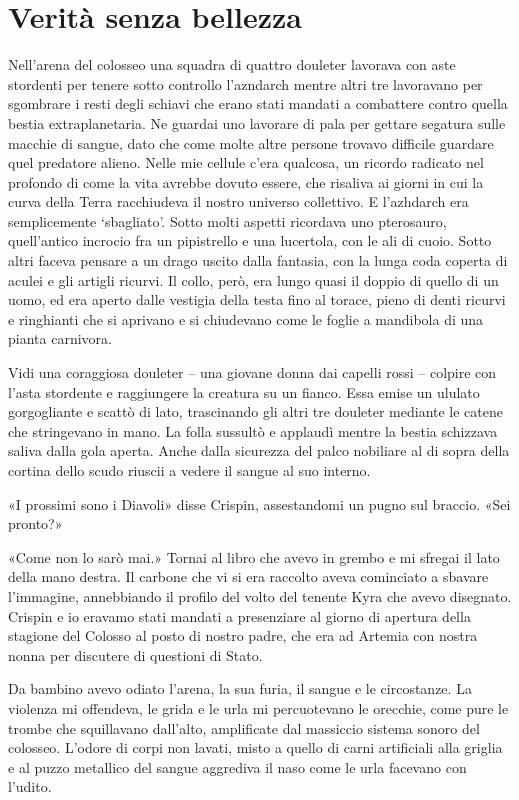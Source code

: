 \chapter{Verità senza bellezza}

Nell'arena del colosseo una squadra di quattro douleter lavorava con
aste stordenti per tenere sotto controllo l'azndarch mentre altri tre
lavoravano per sgombrare i resti degli schiavi che erano stati mandati a
combattere contro quella bestia extraplanetaria. Ne guardai uno lavorare
di pala per gettare segatura sulle macchie di sangue, dato che come
molte altre persone trovavo difficile guardare quel predatore alieno.
Nelle mie cellule c'era qualcosa, un ricordo radicato nel profondo di
come la vita avrebbe dovuto essere, che risaliva ai giorni in cui la
curva della Terra racchiudeva il nostro universo collettivo. E
l'azhdarch era semplicemente `sbagliato'. Sotto molti aspetti ricordava
uno pterosauro, quell'antico incrocio fra un pipistrello e una
lucertola, con le ali di cuoio. Sotto altri faceva pensare a un drago
uscito dalla fantasia, con la lunga coda coperta di aculei e gli artigli
ricurvi. Il collo, però, era lungo quasi il doppio di quello di un uomo,
ed era aperto dalle vestigia della testa fino al torace, pieno di denti
ricurvi e ringhianti che si aprivano e si chiudevano come le foglie a
mandibola di una pianta carnivora.

Vidi una coraggiosa douleter -- una giovane donna dai capelli rossi --
colpire con l'asta stordente e raggiungere la creatura su un fianco.
Essa emise un ululato gorgogliante e scattò di lato, trascinando gli
altri tre douleter mediante le catene che stringevano in mano. La folla
sussultò e applaudì mentre la bestia schizzava saliva dalla gola aperta.
Anche dalla sicurezza del palco nobiliare al di sopra della cortina
dello scudo riuscii a vedere il sangue al suo interno.

«I prossimi sono i Diavoli» disse Crispin, assestandomi un pugno sul
braccio. «Sei pronto?»

«Come non lo sarò mai.» Tornai al libro che avevo in grembo e mi sfregai
il lato della mano destra. Il carbone che vi si era raccolto aveva
cominciato a sbavare l'immagine, annebbiando il profilo del volto del
tenente Kyra che avevo disegnato. Crispin e io eravamo stati mandati a
presenziare al giorno di apertura della stagione del Colosso al posto di
nostro padre, che era ad Artemia con nostra nonna per discutere di
questioni di Stato.

Da bambino avevo odiato l'arena, la sua furia, il sangue e le
circostanze. La violenza mi offendeva, le grida e le urla mi
percuotevano le orecchie, come pure le trombe che squillavano dall'alto,
amplificate dal massiccio sistema sonoro del colosseo. L'odore di corpi
non lavati, misto a quello di carni artificiali alla griglia e al puzzo
metallico del sangue aggrediva il naso come le urla facevano con
l'udito.

